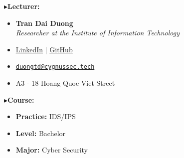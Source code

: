 \begin{frame}[t,plain]
  \vspace{0.04cm}
  {\color{TitleColor}\fontsize{20}{24}\selectfont\bfseries
    \textcolor{ResultColor}{$\blacktriangleright$}\hspace{0.18cm}Lecturer:\par}

  \vspace{0.02cm}
  \begin{itemize}
    \setlength{\itemsep}{0.02cm}
    \item \textbf{Tran Dai Duong}\\[-0.02cm]
      \textit{Researcher at the Institute of Information Technology}
    \item \href{https://www.linkedin.com/in/cygnussec}{\textcolor{ResearchColor}{\underline{LinkedIn}}}
      \hspace{0.14cm}|\hspace{0.14cm}
      \href{https://github.com/CygnusSec}{\textcolor{ResearchColor}{\underline{GitHub}}}
    \item \href{mailto:duongtd@cygnussec.tech}{\textcolor{ResearchColor}{\texttt{duongtd@cygnussec.tech}}}
    \item A3 - 18 Hoang Quoc Viet Street
  \end{itemize}

  \vspace{0.04cm}
  {\color{TitleColor}\fontsize{20}{24}\selectfont\bfseries
    \textcolor{ResultColor}{$\blacktriangleright$}\hspace{0.18cm}Course:\par}

  \vspace{0.02cm}
  \begin{itemize}
    \setlength{\itemsep}{0.02cm}
    \item \textbf{Practice:} IDS/IPS
    \item \textbf{Level:} Bachelor
    \item \textbf{Major:} Cyber Security
  \end{itemize}
\end{frame}
